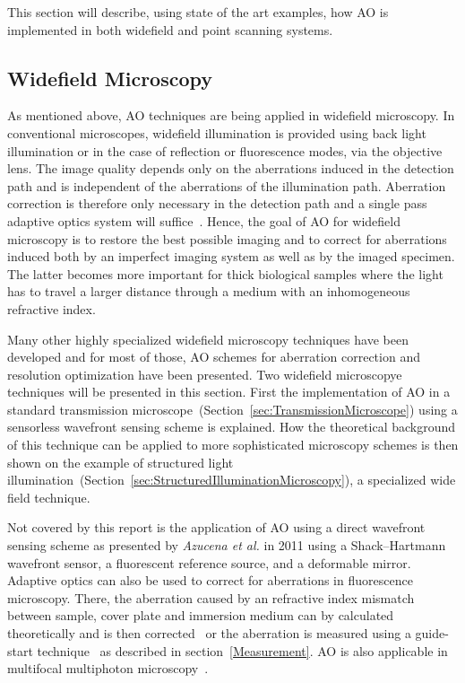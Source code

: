 This section will describe, using state of the art examples, how AO is implemented in both widefield and point scanning systems.  


\subsection{Widefield Microscopy}
\label{sec:WidefieldMicroscopy}

As mentioned above, AO techniques are being applied in widefield microscopy. In conventional microscopes, widefield illumination is provided using back light illumination or in the case of reflection or fluorescence modes, via the objective lens. The image quality depends only on the aberrations induced in the detection path and is independent of the aberrations of the illumination path. Aberration correction is therefore only necessary in the detection path and a single pass adaptive optics system will suffice~\cite{book_aberrations}. Hence, the goal of AO for widefield microscopy is to restore the best possible imaging and to correct for aberrations induced both by an imperfect imaging system as well as by the imaged specimen. The latter becomes more important for thick biological samples where the light has to travel a larger distance through a medium with an inhomogeneous refractive index. 

Many other highly specialized widefield microscopy techniques have been developed and for most of those, AO schemes for aberration correction and resolution optimization have been presented. Two widefield microscopye techniques will be presented in this section. First the implementation of AO in a standard transmission microscope~(Section~\ref{sec:TransmissionMicroscope}) using a sensorless wavefront sensing scheme is explained. How the theoretical background of this technique can be applied to more sophisticated microscopy schemes is then shown on the example of structured light illumination~(Section~\ref{sec:StructuredIlluminationMicroscopy}), a specialized wide field technique. 

Not covered by this report is the application of AO using a direct wavefront sensing scheme as presented by \emph{Azucena et al.} in 2011 using a Shack–Hartmann wavefront sensor, a fluorescent reference source, and a deformable mirror\cite{wide_directSensing_microscope}. Adaptive optics can also be used to correct for aberrations in fluorescence microscopy.  There, the aberration caused by an refractive index mismatch between sample, cover plate and immersion medium can by calculated theoretically and is then corrected~\cite{wide_AOM_FM_spehrical_correction} or the aberration is measured using a guide-start technique~\cite{wide_fluorescence_guide_star} as described in section~\ref{Measurement}. AO is also applicable in multifocal multiphoton microscopy~\cite{wide_MPFM,wide_MMM_AO}.


